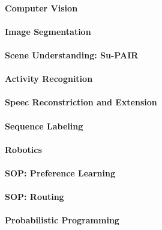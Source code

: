 		\paragraph{Computer Vision} %

		\paragraph{Image Segmentation} %

		\paragraph{Scene Understanding: Su-PAIR} %

		\paragraph{Activity Recognition} %

		\paragraph{Speec Reconstriction and Extension} %

		\paragraph{Sequence Labeling} %

		\paragraph{Robotics} %

		\paragraph{SOP: Preference Learning} %

		\paragraph{SOP: Routing} %

		\paragraph{Probabilistic Programming} %

